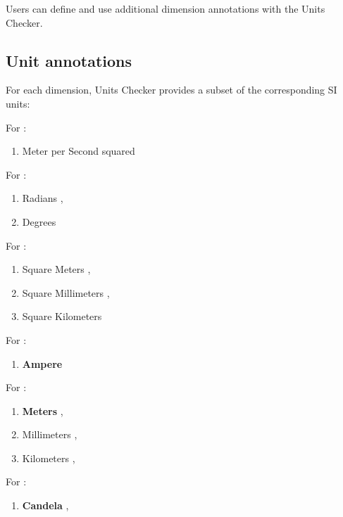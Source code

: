 Users can define and use additional dimension annotations with the Units
Checker.

\subsection{Unit annotations\label{unit-annotations}}

For each dimension, Units Checker provides a subset of the corresponding SI
units:

For :
\begin{enumerate}
\item Meter per Second squared 
\end{enumerate}

For :
\begin{enumerate}
\item Radians ,
\item Degrees 
\end{enumerate}

For :
\begin{enumerate}
\item Square Meters ,
\item Square Millimeters ,
\item Square Kilometers 
\end{enumerate}

For :
\begin{enumerate}
\item \textbf{Ampere} 
\end{enumerate}

For :
\begin{enumerate}
\item \textbf{Meters} ,
\item Millimeters ,
\item Kilometers ,
\end{enumerate}

For :
\begin{enumerate}
\item \textbf{Candela} ,
\end{enumerate}

